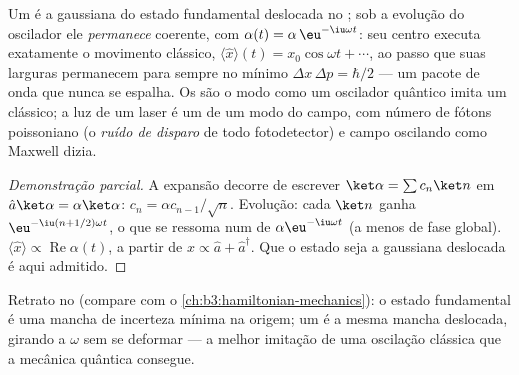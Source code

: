 \begin{proposition}\label{prop:b3:harmonic-oscillator:coherent-motion}
Um  é a gaussiana do estado fundamental deslocada no
; sob a evolução do oscilador ele \emph{permanece}
coerente, com $\alpha(t) = \alpha\,\eu^{-\iu\omega t}$: seu centro
executa exatamente o movimento clássico, $\langle\hat x\rangle(t) =
x_0\cos\omega t + \cdots$, ao passo que suas larguras permanecem para
sempre no mínimo $\Delta x\,\Delta p = \hbar/2$ --- um pacote de onda
que nunca se espalha. Os  são o modo como um oscilador
quântico imita um clássico; a luz de um laser é um  de
um modo do campo, com número de fótons poissoniano (o \emph{ruído de
disparo} de todo fotodetector) e campo oscilando como Maxwell dizia.
\end{proposition}

\begin{proof}[Demonstração parcial]
A expansão decorre de escrever $\ket\alpha = \sum c_n\ket n$ em
$\hat a\ket\alpha = \alpha\ket\alpha$: $c_n = \alpha c_{n-1}/\sqrt
n$. Evolução: cada $\ket n$ ganha $\eu^{-\iu(n + 1/2)\omega t}$, o que
se ressoma num  de $\alpha\eu^{-\iu\omega t}$ (a menos
de fase global). $\langle\hat x\rangle \propto
\operatorname{Re}\alpha(t)$, a partir de $\hat x \propto \hat a +
\hat a^\dagger$. Que o estado seja a gaussiana deslocada é aqui
admitido.
\end{proof}

\begin{omfigure}

{\small Retrato no  (compare com o
\cref{ch:b3:hamiltonian-mechanics}): o estado fundamental é uma mancha
de incerteza mínima na origem; um  é a mesma mancha
deslocada, girando a $\omega$ sem se deformar --- a melhor imitação de
uma oscilação clássica que a mecânica quântica consegue.}
\end{omfigure}

